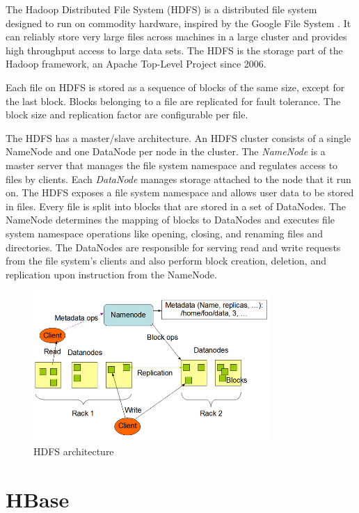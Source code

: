 The Hadoop Distributed File System (HDFS) \cite{hadoop,hdfs_design} is a distributed file system designed to run on commodity hardware, inspired by the Google File System \cite{gfs}. It can reliably store very large files across machines in a large cluster and provides high throughput access to large data sets. The HDFS is the storage part of the Hadoop framework, an Apache Top-Level Project since 2006.

Each file on HDFS is stored as a sequence of blocks of the same size, except for the last block. Blocks belonging to a file are replicated for fault tolerance. The block size and replication factor are configurable per file.

The HDFS has a master/slave architecture. An HDFS cluster consists of a single NameNode and one DataNode per node in the cluster. The \emph{NameNode} is a master server that manages the file system namespace and regulates access to files by clients. Each \emph{DataNode} manages storage attached to the node that it run on. The HDFS exposes a file system namespace and allows user data to be stored in files. Every file is split into blocks that are stored in a set of DataNodes. The NameNode determines the mapping of blocks to DataNodes and executes file system namespace operations like opening, closing, and renaming files and directories. The DataNodes are responsible for serving read and write requests from the file system’s clients and also perform block creation, deletion, and replication upon instruction from the NameNode.

\begin{figure}[H]
\centering
\includegraphics[width=0.8\textwidth]{figures/hdfs_architecture}
\caption{HDFS architecture}
\label{figure:hdfs_architecture}
\end{figure}


\section{HBase}

